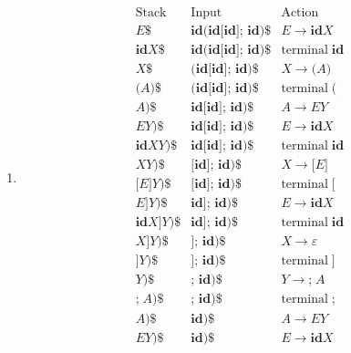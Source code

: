 \documentclass[11pt]{article}
\begin{document}
\begin{enumerate}
\begin{enumerate}
			\item
				\[
					\begin{array}{lll}
						\mathrm{Stack} & \mathrm{Input} & \mathrm{Action} \\
						\hline
						E \textbf{\$} & \textbf{id(id[id]; id)\$}
						& E \rightarrow \mathbf{id} X \\
						\mathbf{id} X \textbf{\$} & \textbf{id(id[id]; id)\$}
						& \mathrm{terminal} \; \mathbf{id} \\
						X \textbf{\$} & \textbf{(id[id]; id)\$}
						& X \rightarrow \textbf{(} A \textbf{)} \\
						\textbf{(} A \textbf{)} \textbf{\$} & \textbf{(id[id]; id)\$}
						& \mathrm{terminal} \; \textbf{(} \\
						A \textbf{)} \textbf{\$} & \textbf{id[id]; id)\$}
						& A \rightarrow EY \\
						EY \textbf{)} \textbf{\$} & \textbf{id[id]; id)\$}
						& E \rightarrow \mathbf{id} X \\
						\mathbf{id} XY \textbf{)} \textbf{\$} & \textbf{id[id]; id)\$}
						& \mathrm{terminal} \; \mathbf{id} \\
						XY \textbf{)} \textbf{\$} & \textbf{[id]; id)\$}
						& X \rightarrow \textbf{[} E \textbf{]} \\
						\textbf{[} E \textbf{]} Y \textbf{)} \textbf{\$}
						& \textbf{[id]; id)\$} & \mathrm{terminal} \; \textbf{[} \\
						E \textbf{]} Y \textbf{)} \textbf{\$} & \textbf{id]; id)\$}
						& E \rightarrow \mathbf{id} X \\
						\mathbf{id} X \textbf{]} Y \textbf{)} \textbf{\$}
						& \textbf{id]; id)\$} & \mathrm{terminal} \; \mathbf{id} \\
						X \textbf{]} Y \textbf{)} \textbf{\$} & \textbf{]; id)\$}
						& X \rightarrow \varepsilon \\
						\textbf{]} Y \textbf{)} \textbf{\$} & \textbf{]; id)\$}
						& \mathrm{terminal} \; \textbf{]} \\
						Y \textbf{)} \textbf{\$} & \textbf{; id)\$}
						& Y \rightarrow \textbf{;} \; A \\
						\textbf{;} \; A \textbf{)} \textbf{\$} & \textbf{; id)\$}
						& \mathrm{terminal} \; \textbf{;} \\
						A \textbf{)} \textbf{\$} & \textbf{id)\$} & A \rightarrow EY \\
						EY \textbf{)} \textbf{\$} & \textbf{id)\$}
						& E \rightarrow \mathbf{id} X \\

\end{array}\]
\end{enumerate}
\end{enumerate}
\end{document}
